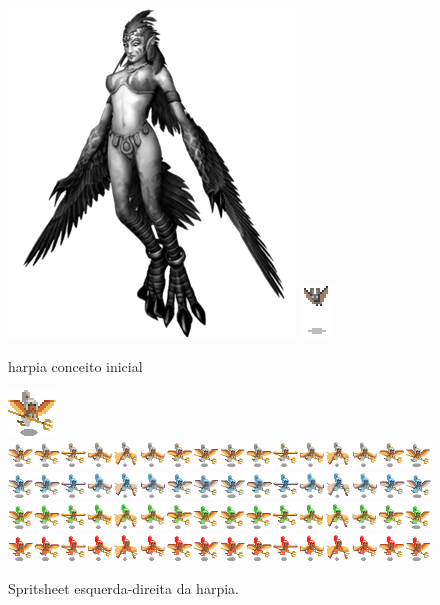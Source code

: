 \documentclass[11pt]{article} %
\begin{document}
\begin{figure}[!htp]
\centering
\includegraphics[scale=0.75]{res/characters/harpia.png} \quad
\includegraphics[scale=2]{res/characters/bat.png} 
\caption{harpia conceito inicial}
\label{harpia}
\end{figure}

\begin{figure}[!htp]
\centering
\advance\leftskip-4cm
\advance\rightskip-3cm
\includegraphics[scale=2]{res/units/harpia/preharpia.png} \quad
\includegraphics[scale=0.7]{res/units/harpia/harpiasheet.png} \quad
\includegraphics[scale=0.7]{res/units/harpia/harpiasheet_congelado.png} \quad
\includegraphics[scale=0.7]{res/units/harpia/harpiasheet_verde.png} \quad
\includegraphics[scale=0.7]{res/units/harpia/harpiasheet_vermelho.png} 
\caption{Spritsheet esquerda-direita da harpia.}
\label{harpiasheet}
\end{figure}
\end{document}
